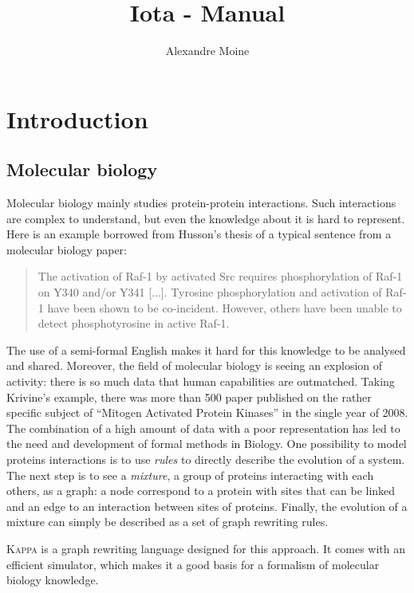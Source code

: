 \documentclass[10pt,a4paper]{article}
\author{Alexandre Moine}
\title{Iota - Manual}
\newcommand\Kappa{\textsc{Kappa}}
\begin{document}
\maketitle
\tableofcontents

\section{Introduction}

\subsection{Molecular biology}
Molecular biology mainly studies protein-protein interactions. Such interactions are complex to understand, but even the knowledge about it is hard to represent. Here is an example borrowed from Husson's\cite{husson} thesis of a typical sentence from a molecular biology paper:

\begin{quote}
  The activation of Raf-1 by activated Src requires phosphorylation of Raf-1 on Y340 and/or
  Y341 [...]. Tyrosine phosphorylation and activation of Raf-1 have been shown to be co-incident.
  However, others have been unable to detect phosphotyrosine in active Raf-1.\cite{masson}
\end{quote}

The use of a semi-formal English makes it hard for this knowledge to be analysed and shared.
Moreover, the field of molecular biology is seeing an explosion of activity: there is so much data that human capabilities are outmatched. Taking Krivine's example\cite{siglog}, there was more than 500 paper published on the rather specific subject of ``Mitogen Activated Protein Kinases'' in the single year of 2008.\\

The combination of a high amount of data with a poor representation has led to the need and development of formal methods in Biology\cite{fontana}. One possibility to model proteins interactions is to use \emph{rules} to directly describe the evolution of a system. The next step is to see a \emph{mixture}, a group of proteins interacting with each others, as a graph: a node correspond to a protein with sites that can be linked and an edge to an interaction between sites of proteins. Finally, the evolution of a mixture can simply be described as a set of graph rewriting rules.

\Kappa{}\cite{kappa} is a graph rewriting language designed for this approach. It comes with an efficient simulator, which makes it a good basis for a formalism of molecular biology knowledge.
\end{document}
